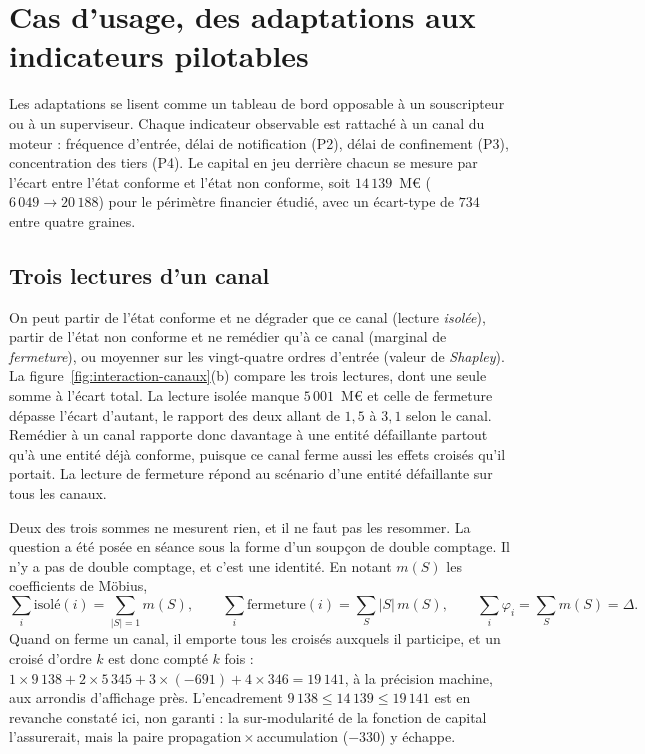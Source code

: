 \section{Cas d'usage, des adaptations aux indicateurs pilotables}
\label{sec:kpi}

Les adaptations se lisent comme un tableau de bord opposable à un souscripteur ou à un superviseur.
Chaque indicateur observable est rattaché à un canal du moteur : fréquence d'entrée, délai de
notification (P2), délai de confinement (P3), concentration des tiers (P4). Le capital en jeu derrière
chacun se mesure par l'écart entre l'état conforme et l'état non conforme, soit $14\,139$~M\euro{}
($6\,049 \to 20\,188$) pour le périmètre financier étudié, avec un écart-type de $734$ entre quatre graines.

\subsection{Trois lectures d'un canal}

On peut partir de l'état conforme et ne dégrader que ce canal (lecture \emph{isolée}), partir de
l'état non conforme et ne remédier qu'à ce canal (marginal de \emph{fermeture}), ou moyenner sur les
vingt-quatre ordres d'entrée (valeur de \emph{Shapley}). La figure~\ref{fig:interaction-canaux}(b)
compare les trois lectures, dont une seule somme à l'écart total. La lecture isolée manque
$5\,001$~M\euro{} et celle de fermeture dépasse l'écart d'autant, le rapport des deux allant de $1{,}5$
à $3{,}1$ selon le canal. Remédier à un canal rapporte donc davantage à une entité défaillante partout
qu'à une entité déjà conforme, puisque ce canal ferme aussi les effets croisés qu'il portait. La lecture de fermeture répond au scénario d'une entité défaillante sur tous les canaux.

Deux des trois sommes ne mesurent rien, et il ne faut pas les resommer. La question a été posée en
séance sous la forme d'un soupçon de double comptage. Il n'y a pas de double comptage, et c'est une
identité. En notant $m(S)$ les coefficients de Möbius,
\[
  \sum_i \text{isolé}(i) = \!\!\sum_{|S|=1}\!\! m(S), \qquad
  \sum_i \text{fermeture}(i) = \sum_S |S|\,m(S), \qquad
  \sum_i \varphi_i = \sum_S m(S) = \Delta .
\]
Quand on ferme un canal, il emporte tous les croisés auxquels il participe, et un croisé d'ordre $k$
est donc compté $k$ fois :
$1\times 9\,138 + 2\times 5\,345 + 3\times(-691) + 4\times 346 = 19\,141$, à la précision machine, aux arrondis d'affichage près.
L'encadrement $9\,138 \leq 14\,139 \leq 19\,141$ est en revanche constaté ici, non garanti : la
sur-modularité de la fonction de capital l'assurerait, mais la paire propagation\,$\times$\,accumulation ($-330$) y échappe.

